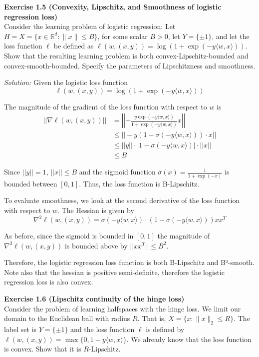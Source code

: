 \documentclass[
	10pt, %
	a4paper, %
	oneside, %
	headinclude,footinclude, %
	BCOR5mm, %
]{scrartcl}
\newenvironment{problem}[2][]
{ \begin{mdframed}[backgroundcolor=gray!20] \textbf{#1 #2} \\}
		{  \end{mdframed}}
\newenvironment{solution}
{\textit{Solution:}}
{}
\begin{document}
\begin{problem}{Exercise 1.5 (Convexity, Lipschitz, and Smoothness of logistic regression loss)}
Consider the learning problem of logistic regression: Let $H = X = \{x \in \mathbb{R}^d : \|x\| \leq B\}$, for some scalar $B > 0$, let $Y = \{\pm1\}$, and let the loss function $\ell$ be defined as $\ell(w, (x, y)) = \log(1 + \exp(-y\langle w, x \rangle))$. Show that the resulting learning problem is both convex-Lipschitz-bounded and convex-smooth-bounded. Specify the parameters of Lipschitzness and smoothness.
\end{problem}

\begin{solution}
	Given the logistic loss function
	\[\ell(w, (x, y)) = \log(1 + \exp(-y\langle w, x \rangle))\]

	The magnitude of the gradient of the loss function with respect to $w$ is
	\begin{align*}
		||\nabla \ell(w, (x, y))|| & = \left|\left| -\frac{y \exp(-y\langle w, x \rangle)}{1+\exp(-y\langle w, x \rangle)}x \right|\right| \\
		                           & \leq || -y (1-\sigma(-y\langle w, x\rangle)) \cdot x ||                                               \\
		                           & \leq ||y|| \cdot |1 - \sigma(-y\langle w,x\rangle)| \cdot ||x||                                       \\
		                           & \leq B
	\end{align*}

	Since $||y||=1$, $||x|| \leq B$ and the sigmoid function $\sigma(x)=\frac{1}{1+\exp(-x)}$ is bounded between $[0,1]$. Thus, the loss function is B-Lipschitz.

	To evaluate smoothness, we look at the second derivative of the loss function with respect to $w$. The Hessian is given by
	\[\nabla^2 \ell(w, (x, y)) = \sigma(-y \langle w,x\rangle) \cdot (1-\sigma(-y \langle w,x\rangle))  x x^T \]

	As before, since the sigmoid is bounded in $[0,1]$ the magnitude of $\nabla^2 \ell(w, (x, y))$ is bounded above by $||xx^T|| \leq B^2$.

	Therefore, the logistic regression loss function is both B-Lipschitz and B²-smooth. Note also that the hessian is positive semi-definite, therefore the logistic regression loss is also convex.
\end{solution}

\begin{problem}{Exercise 1.6 (Lipschitz continuity of the hinge loss)}
Consider the problem of learning halfspaces with the hinge loss. We limit our domain to the Euclidean ball with radius $R$. That is, $X = \{x : \|x\|_2 \leq R\}$. The label set is $Y = \{\pm1\}$ and the loss function $\ell$ is defined by $\ell(w, (x, y)) = \max\{0, 1 - y\langle w, x \rangle\}$. We already know that the loss function is convex. Show that it is $R$-Lipschitz.
\end{problem}
\end{document}
